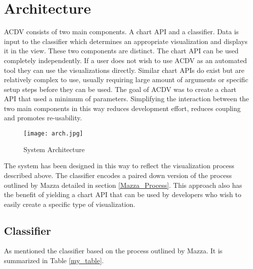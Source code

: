 \documentclass[a4paper, 11pt, titlepage, onehalfspacing]{report}
\begin{document}
\section{Architecture}
AC\lightning{}DV consists of two main components. A chart API and a classifier. Data is input to the classifier which determines an appropriate visualization and displays it in the view. These two components are distinct. The chart API can be used completely independently. If a user does not wish to use AC\lightning{}DV as an automated tool they can use the visualizations directly. Similar chart APIs do exist \cite{dcjs} but are relatively complex to use, usually requiring large amount of arguments or specific setup steps before they can be used. The goal of AC\lightning{}DV was to create a chart API that used a minimum of parameters. Simplifying the interaction between the two main components in this way reduces development effort, reduces coupling and promotes re-usability.

\begin{figure}[htp] \centering
\texttt{[image: arch.jpg]}
\caption{System Architecture}
\label{fingal1}
\end{figure}



The system has been designed in this way to reflect the visualization process described above. The classifier encodes a paired down version of the process outlined by Mazza detailed in section \ref{Mazza_Process}. This approach also has the benefit of yielding a chart API that can be used by developers who wish to easily create a specific type of visualization.

\subsection{Classifier}
As mentioned the classifier based on the process outlined by Mazza. It is summarized in Table \ref{my_table}.
\end{document}
